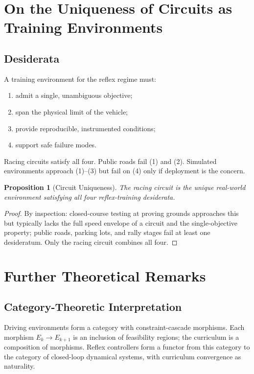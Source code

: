 \documentclass[11pt,twocolumn]{article}
\newtheorem{proposition}[theorem]{Proposition}
\theoremstyle{definition}
\theoremstyle{remark}
\begin{document}
\section{On the Uniqueness of Circuits as Training Environments}
\label{app:uniqueness}

\subsection{Desiderata}

A training environment for the reflex regime must:
\begin{enumerate}[leftmargin=*,itemsep=2pt]
\item admit a single, unambiguous objective;
\item span the physical limit of the vehicle;
\item provide reproducible, instrumented conditions;
\item support safe failure modes.
\end{enumerate}

Racing circuits satisfy all four. Public roads fail (1) and (2). Simulated environments approach (1)--(3) but fail on (4) only if deployment is the concern.

\begin{proposition}[Circuit Uniqueness]\label{prop:circuit-unique}
The racing circuit is the unique real-world environment satisfying all four reflex-training desiderata.
\end{proposition}

\begin{proof}
By inspection: closed-course testing at proving grounds approaches this but typically lacks the full speed envelope of a circuit and the single-objective property; public roads, parking lots, and rally stages fail at least one desideratum. Only the racing circuit combines all four.
\end{proof}

\section{Further Theoretical Remarks}
\label{app:theoretical}

\subsection{Category-Theoretic Interpretation}

Driving environments form a category with constraint-cascade morphisms. Each morphism $E_k \to E_{k+1}$ is an inclusion of feasibility regions; the curriculum is a composition of morphisms. Reflex controllers form a functor from this category to the category of closed-loop dynamical systems, with curriculum convergence as naturality.
\end{document}
